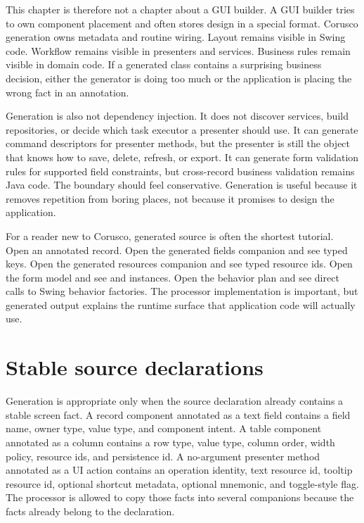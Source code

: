 This chapter is therefore not a chapter about a GUI builder. A GUI builder
tries to own component placement and often stores design in a special format.
Corusco generation owns metadata and routine wiring. Layout remains visible in
Swing code. Workflow remains visible in presenters and services. Business
rules remain visible in domain code. If a generated class contains a surprising
business decision, either the generator is doing too much or the application is
placing the wrong fact in an annotation.

Generation is also not dependency injection. It does not discover services,
build repositories, or decide which task executor a presenter should use. It
can generate command descriptors for presenter methods, but the presenter is
still the object that knows how to save, delete, refresh, or export. It can
generate form validation rules for supported field constraints, but
cross-record business validation remains Java code. The boundary should feel
conservative. Generation is useful because it removes repetition from boring
places, not because it promises to design the application.

For a reader new to Corusco, generated source is often the shortest tutorial.
Open an annotated record. Open the generated fields companion and see typed
keys. Open the generated resources companion and see typed resource ids. Open
the form model and see  and  instances.
Open the behavior plan and see direct calls to Swing behavior factories. The
processor implementation is important, but generated output explains the
runtime surface that application code will actually use.

\section{Stable source declarations}

Generation is appropriate only when the source declaration already contains a
stable screen fact. A record component annotated as a text field contains a
field name, owner type, value type, and component intent. A table component
annotated as a column contains a row type, value type, column order, width
policy, resource ids, and persistence id. A no-argument presenter method
annotated as a UI action contains an operation identity, text resource id,
tooltip resource id, optional shortcut metadata, optional mnemonic, and
toggle-style flag. The processor is allowed to copy those facts into several
companions because the facts already belong to the declaration.

